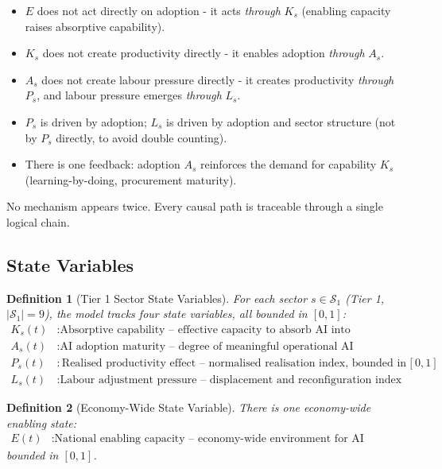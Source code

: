 \documentclass[11pt,a4paper]{article}
\newtheorem{definition}{Definition}
\begin{document}
\begin{itemize}
  \item $E$ does not act directly on adoption - it acts \emph{through} $K_s$ (enabling capacity raises absorptive capability).
  \item $K_s$ does not create productivity directly - it enables adoption \emph{through} $A_s$.
  \item $A_s$ does not create labour pressure directly - it creates productivity \emph{through} $P_s$, and labour pressure emerges \emph{through} $L_s$.
  \item $P_s$ is driven by adoption; $L_s$ is driven by adoption and sector structure (not by $P_s$ directly, to avoid double counting).
  \item There is one feedback: adoption $A_s$ reinforces the demand for capability $K_s$ (learning-by-doing, procurement maturity).
\end{itemize}

No mechanism appears twice. Every causal path is traceable through a single logical chain.

\subsection{State Variables}

\begin{definition}[Tier 1 Sector State Variables]
For each sector $s \in \mathcal{S}_1$ (Tier 1, $|\mathcal{S}_1| = 9$), the model tracks four state variables, all bounded in $[0,1]$:
\begin{align}
K_s(t) &: \text{Absorptive capability -- effective capacity to absorb AI into productive use} \\
A_s(t) &: \text{AI adoption maturity -- degree of meaningful operational AI deployment} \\
P_s(t) &: \text{Realised productivity effect -- normalised realisation index, bounded in $[0,1]$} \\
L_s(t) &: \text{Labour adjustment pressure -- displacement and reconfiguration index}
\end{align}
\end{definition}

\begin{definition}[Economy-Wide State Variable]
There is one economy-wide enabling state:
\begin{align}
E(t) &: \text{National enabling capacity -- economy-wide environment for AI adoption}
\end{align}
bounded in $[0,1]$.
\end{definition}
\end{document}
